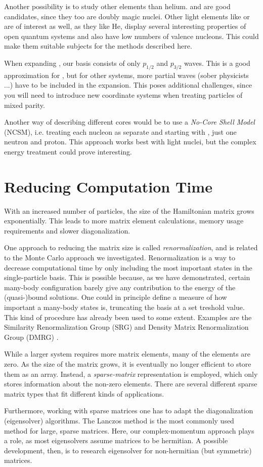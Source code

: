 \documentclass[../main/report.tex]{subfiles}
\begin{document}
Another possibility is to study other elements than helium.  and  are good candidates, since they too are doubly magic nuclei.
Other light elements like  or  are of interest as well, as they like He, display several interesting properties of open quantum systems and also have low numbers of valence nucleons. 
This could make them suitable subjects for the methods described here.

When expanding , our basis consists of only $p_{1/2}$ and $p_{3/2}$ waves. 
This is a good approximation for  \cite{gamow_shell_model_2008},  but for other systems, more partial waves (sober physicists ...) have to be included in the expansion. 
This poses additional challenges, since you will need to introduce new coordinate systems when treating particles of mixed parity. 

Another way of describing different cores would be to use a \emph{No-Core Shell Model} (NCSM), i.e. treating each nucleon as separate and starting with , just one neutron and proton. 
This approach works best with light nuclei, but the complex energy treatment could prove interesting.

\section{Reducing Computation Time}
With an increased number of particles, the size of the Hamiltonian matrix grows exponentially. This leads to more matrix element calculations, memory usage requirements and slower diagonalization.

One approach to reducing the matrix size is called \emph{renormalization}, and is related to the Monte Carlo approach we investigated. 
Renormalization is a way to decrease computational time by only including the most important states in the single-particle basis.
This is possible because, as we have demonstrated, certain many-body configuration barely give any contribution to the energy of the (quasi-)bound solutions. 
One could in principle define a  measure of how important a many-body states is, truncating the basis at a set treshold value. 
This kind of procedure has already been used to some extent. 
Examples are the Similarity Renormalization Group (SRG) and Density Matrix Renormalization Group (DMRG) \cite{DMRG}. 

While a larger system requires more matrix elements, many of the elements are zero. 
As the size of the matrix grows, it is eventually no longer efficient to store them as an array. 
Instead, a \emph{sparse-matrix} representation is employed, which only stores information about the non-zero elements. 
There are several different sparse matrix types that fit different kinds of applications. 

Furthermore, working with sparse matrices one has to adapt the diagonalization (eigensolver) algorithms. 
The Lanczos method is the most commonly used method for large, sparse matrices.
Here, our complex-momentum approach plays a role, as most eigensolvers assume matrices to be hermitian.
A possible development, then, is to research eigensolver for non-hermitian (but symmetric) matrices.
\end{document}
